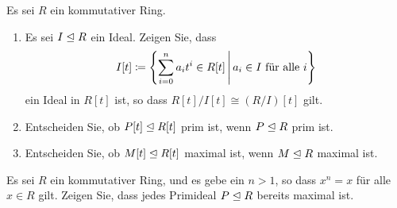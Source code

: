 \documentclass[a4paper, 10pt]{scrartcl}
\begin{document}
\begin{question}
  Es sei $R$ ein kommutativer Ring.
  \begin{enumerate}
    \item
      Es sei $I \mathrel{\trianglelefteq} R$ ein Ideal.
      Zeigen Sie, dass
      \[
                  I[t]
        \defined  \left\{
                    \sum_{i=0}^n a_i t^i \in R[t]
                  \suchthat*
                    \text{$a_i \in I$ für alle $i$}
                  \right\}
      \]
      ein Ideal in $R[t]$ ist, so dass $R[t]/I[t] \cong (R/I)[t]$ gilt.
    \item
      Entscheiden Sie, ob $P[t] \mathrel{\trianglelefteq} R[t]$ prim ist, wenn $P \mathrel{\trianglelefteq} R$ prim ist.
    \item
      Entscheiden Sie, ob $M[t] \mathrel{\trianglelefteq} R[t]$ maximal ist, wenn $M \mathrel{\trianglelefteq} R$ maximal ist.
  \end{enumerate}
\end{question}

\begin{question}
  Es sei $R$ ein kommutativer Ring, und es gebe ein $n > 1$, so dass $x^n = x$ für alle $x \in R$ gilt.
  Zeigen Sie, dass jedes Primideal $P \mathrel{\trianglelefteq} R$ bereits maximal ist.
\end{question}
\end{document}

